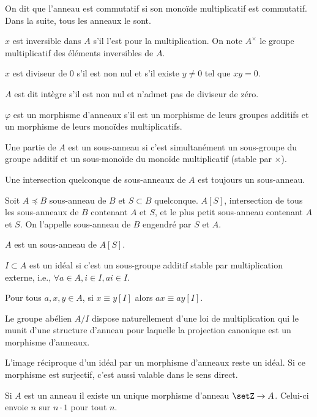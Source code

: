 \documentclass[a4paper,11pt,twocolumn]{article}\usepackage[landscape]{geometry}
\begin{document}
    On dit que l'anneau est commutatif si son monoïde multiplicatif est commutatif. Dans la suite, tous les anneaux le sont.

     $x$ est inversible dans $A$ s'il l'est pour la multiplication. On note $A^\times$ le groupe multiplicatif des éléments inversibles de $A$.

     $x$ est diviseur de $0$ s'il est non nul et s'il existe $y\neq 0$ tel que $xy=0$.

     $A$ est dit intègre s'il est non nul et n'admet pas de diviseur de zéro.

     $\varphi$ est un morphisme d'anneaux s'il est un morphisme de leurs groupes additifs et un morphisme de leurs monoïdes multiplicatifs.

     Une partie de $A$ est un sous-anneau si c'est simultanément un sous-groupe du groupe additif et un sous-monoïde du monoïde multiplicatif (stable par $\times$).

     Une intersection quelconque de sous-anneaux de $A$ est toujours un sous-anneau.

     Soit $A\preccurlyeq B$ sous-anneau de $B$ et $S\subset B$ quelconque. $A[S]$, intersection de tous les sous-anneaux de $B$ contenant $A$ et $S$, et le plus petit sous-anneau contenant $A$ et $S$. On l'appelle sous-anneau de $B$ engendré par $S$ et $A$.

    $A$ est un sous-anneau de $A[S]$.

     $I\subset A$ est un idéal si c'est un sous-groupe additif stable par multiplication externe, i.e., $\forall a\in A, i\in I, ai\in I$.

     Pour tous $a,x,y\in A$, si $x\equiv y [I]$ alors $ax\equiv ay [I]$.

     Le groupe abélien $A/I$ dispose naturellement d'une loi de multiplication qui le munit d'une structure d'anneau pour laquelle la projection canonique est un morphisme d'anneaux.

     L'image réciproque d'un idéal par un morphisme d'anneaux reste un idéal. Si ce morphisme est surjectif, c'est aussi valable dans le sens direct.

     Si $A$ est un anneau il existe un unique morphisme d'anneau $\setZ\rightarrow A$. Celui-ci envoie $n$ sur $n\cdot 1$ pour tout $n$.
\end{document}
